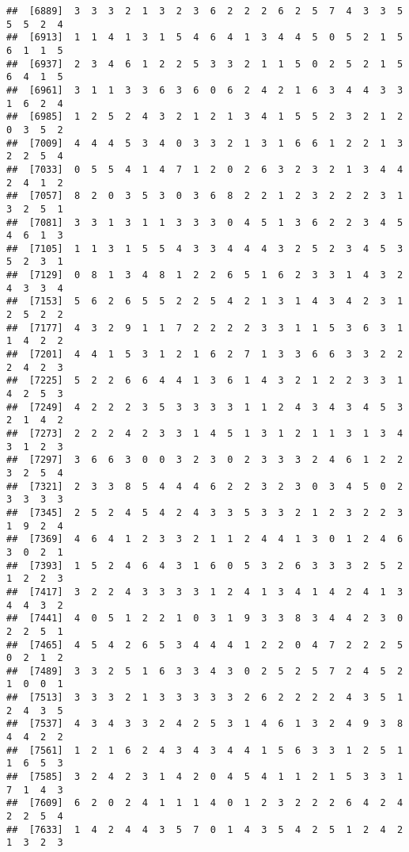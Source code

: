 \documentclass[
]{article}
\begin{document}
\begin{verbatim}
##  [6889]  3  3  3  2  1  3  2  3  6  2  2  2  6  2  5  7  4  3  3  5  5  5  2  4
##  [6913]  1  1  4  1  3  1  5  4  6  4  1  3  4  4  5  0  5  2  1  5  6  1  1  5
##  [6937]  2  3  4  6  1  2  2  5  3  3  2  1  1  5  0  2  5  2  1  5  6  4  1  5
##  [6961]  3  1  1  3  3  6  3  6  0  6  2  4  2  1  6  3  4  4  3  3  1  6  2  4
##  [6985]  1  2  5  2  4  3  2  1  2  1  3  4  1  5  5  2  3  2  1  2  0  3  5  2
##  [7009]  4  4  4  5  3  4  0  3  3  2  1  3  1  6  6  1  2  2  1  3  2  2  5  4
##  [7033]  0  5  5  4  1  4  7  1  2  0  2  6  3  2  3  2  1  3  4  4  2  4  1  2
##  [7057]  8  2  0  3  5  3  0  3  6  8  2  2  1  2  3  2  2  2  3  1  3  2  5  1
##  [7081]  3  3  1  3  1  1  3  3  3  0  4  5  1  3  6  2  2  3  4  5  4  6  1  3
##  [7105]  1  1  3  1  5  5  4  3  3  4  4  4  3  2  5  2  3  4  5  3  5  2  3  1
##  [7129]  0  8  1  3  4  8  1  2  2  6  5  1  6  2  3  3  1  4  3  2  4  3  3  4
##  [7153]  5  6  2  6  5  5  2  2  5  4  2  1  3  1  4  3  4  2  3  1  2  5  2  2
##  [7177]  4  3  2  9  1  1  7  2  2  2  2  3  3  1  1  5  3  6  3  1  1  4  2  2
##  [7201]  4  4  1  5  3  1  2  1  6  2  7  1  3  3  6  6  3  3  2  2  2  4  2  3
##  [7225]  5  2  2  6  6  4  4  1  3  6  1  4  3  2  1  2  2  3  3  1  4  2  5  3
##  [7249]  4  2  2  2  3  5  3  3  3  3  1  1  2  4  3  4  3  4  5  3  2  1  4  2
##  [7273]  2  2  2  4  2  3  3  1  4  5  1  3  1  2  1  1  3  1  3  4  3  1  2  3
##  [7297]  3  6  6  3  0  0  3  2  3  0  2  3  3  3  2  4  6  1  2  2  3  2  5  4
##  [7321]  2  3  3  8  5  4  4  4  6  2  2  3  2  3  0  3  4  5  0  2  3  3  3  3
##  [7345]  2  5  2  4  5  4  2  4  3  3  5  3  3  2  1  2  3  2  2  3  1  9  2  4
##  [7369]  4  6  4  1  2  3  3  2  1  1  2  4  4  1  3  0  1  2  4  6  3  0  2  1
##  [7393]  1  5  2  4  6  4  3  1  6  0  5  3  2  6  3  3  3  2  5  2  1  2  2  3
##  [7417]  3  2  2  4  3  3  3  3  1  2  4  1  3  4  1  4  2  4  1  3  4  4  3  2
##  [7441]  4  0  5  1  2  2  1  0  3  1  9  3  3  8  3  4  4  2  3  0  2  2  5  1
##  [7465]  4  5  4  2  6  5  3  4  4  4  1  2  2  0  4  7  2  2  2  5  0  2  1  2
##  [7489]  3  3  2  5  1  6  3  3  4  3  0  2  5  2  5  7  2  4  5  2  1  0  0  1
##  [7513]  3  3  3  2  1  3  3  3  3  3  2  6  2  2  2  2  4  3  5  1  2  4  3  5
##  [7537]  4  3  4  3  3  2  4  2  5  3  1  4  6  1  3  2  4  9  3  8  4  4  2  2
##  [7561]  1  2  1  6  2  4  3  4  3  4  4  1  5  6  3  3  1  2  5  1  1  6  5  3
##  [7585]  3  2  4  2  3  1  4  2  0  4  5  4  1  1  2  1  5  3  3  1  7  1  4  3
##  [7609]  6  2  0  2  4  1  1  1  4  0  1  2  3  2  2  2  6  4  2  4  2  2  5  4
##  [7633]  1  4  2  4  4  3  5  7  0  1  4  3  5  4  2  5  1  2  4  2  1  3  2  3

\end{verbatim}
\end{document}
